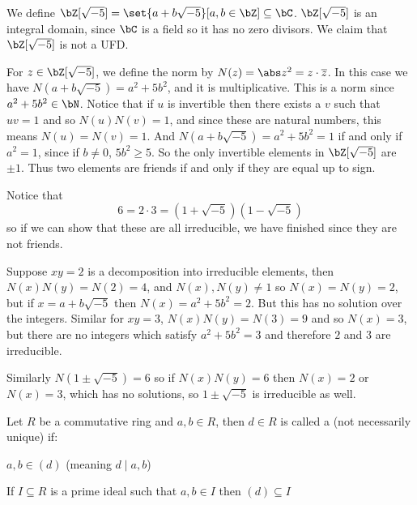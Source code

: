\documentclass[10pt]{article}
\def\divides{{\mid}}
\begin{document}


\bigskip

\begin{exam*}

    We define $\bZ[\sqrt{-5}]=\set{a+b\sqrt{-5}}[a,b\in\bZ]\subseteq\bC$.
    $\bZ[\sqrt{-5}]$ is an integral domain, since $\bC$ is a field so it has no zero divisors.
    We claim that $\bZ[\sqrt{-5}]$ is not a UFD.

    For $z\in\bZ[\sqrt{-5}]$, we define the norm by $N(z)=\abs z^2=z\cdot\overline z$.
    In this case we have $N(a+b\sqrt{-5})=a^2+5b^2$, and it is multiplicative.
    This is a norm since $a^2+5b^2\in\bN$.
    Notice that if $u$ is invertible then there exists a $v$ such that $uv=1$ and so $N(u)N(v)=1$, and since these are natural numbers, this means $N(u)=N(v)=1$.
    And $N(a+b\sqrt{-5})=a^2+5b^2=1$ if and only if $a^2=1$, since if $b\neq0$, $5b^2\geq5$.
    So the only invertible elements in $\bZ[\sqrt{-5}]$ are $\pm1$.
    Thus two elements are friends if and only if they are equal up to sign.

    Notice that
    \[ 6 = 2\cdot3 = (1+\sqrt{-5})(1-\sqrt{-5}) \]
    so if we can show that these are all irreducible, we have finished since they are not friends.

    Suppose $xy=2$ is a decomposition into irreducible elements, then $N(x)N(y)=N(2)=4$, and $N(x),N(y)\neq1$ so $N(x)=N(y)=2$, but if $x=a+b\sqrt{-5}$ then $N(x)=a^2+5b^2=2$.
    But this has no solution over the integers.
    Similar for $xy=3$, $N(x)N(y)=N(3)=9$ and so $N(x)=3$, but there are no integers which satisfy $a^2+5b^2=3$ and therefore $2$ and $3$ are irreducible.

    Similarly $N(1\pm\sqrt{-5})=6$ so if $N(x)N(y)=6$ then $N(x)=2$ or $N(x)=3$, which has no solutions, so $1\pm\sqrt{-5}$ is irreducible as well.

\end{exam*}

\begin{defn*}

    Let $R$ be a commutative ring and $a,b\in R$, then $d\in R$ is called a  (not necessarily unique) if:
    \benum
        \item $a,b\in(d)$ (meaning $d\divides a,b$)
        \item If $I\subseteq R$ is a prime ideal such that $a,b\in I$ then $(d)\subseteq I$
    \eenum

\end{defn*}
\end{document}
